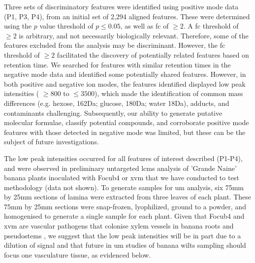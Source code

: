 Three sets of discriminatory features were identified using positive mode data (P1, P3, P4), from an initial set of 2,294 aligned features. These were determined using the $p$ value threshold of $p \le 0.05$, as well as \ac{fc} of $\geq2$. A \ac{fc} threshold of $\geq2$ is arbitrary, and not necessarily biologically relevant. Therefore, some of the features excluded from the analysis may be discriminant. However, the \ac{fc} threshold of $\geq2$ facilitated the discovery of potentially related features based on retention time. We searched for features with similar retention times in the negative mode data and identified some potentially shared features. However, in both positive and negative ion modes, the features identified displayed low peak intensities ( $\geq800$ to $\leq3500$), which made the identification of common mass differences (e.g. hexose, 162Da; glucose, 180Da; water 18Da), adducts, and contaminants challenging. Subsequently, our ability to generate putative molecular formulae, classify potential compounds, and corroborate positive mode features with those detected in negative mode was limited, but these can be the subject of future investigations.

The low peak intensities occurred for all features of interest described (P1-P4), and were observed in preliminary untargeted \ac{lcms} analysis of 'Grande Naine' banana plants inoculated with \ac{Focub4} or \ac{xvm} that we have conducted to test methodology (data not shown). To generate samples for \ac{um} analysis, six 75mm by 25mm sections of lamina were extracted from three leaves of each plant. These 75mm by 25mm sections were snap-frozen, lyophilized, ground to a powder, and homogenised to generate a single sample for each plant. Given that \ac{Focub4} and \ac{xvm} are vascular pathogens that colonise xylem vessels in banana roots and pseudostems \parencite{Li2011, Pegg2019}, we suggest that the low peak intensities will be in part due to a dilution of signal and that future in \ac{um} studies of banana wilts sampling should focus one vasculature tissue, as evidenced below. 

